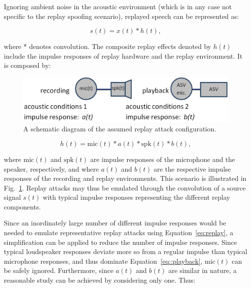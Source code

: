 Ignoring ambient noise in the acoustic environment (which is in any case not specific to the replay spoofing scenario), replayed speech can be represented as:


\begin{equation}
s(t) = x(t)*h(t),
\label{eq:replay}
\end{equation}


\noindent where * denotes convolution.  The composite replay effects denoted by $h(t)$ include the impulse responses of replay hardware and the replay environment.  It is composed by:


\begin{figure}
	\includegraphics[width=1\linewidth]{Figs/replay.png}
	\caption{A schematic diagram of the assumed replay attack configuration. %
}
	\label{fig::Replay}
\end{figure}

\begin{equation}
h(t) = \mathrm{mic}(t) * a(t) * \mathrm{spk}(t) * b(t),
\label{eq::playback}
\end{equation}


\noindent where $\mathrm{mic}(t)$ and $\mathrm{spk}(t)$ are impulse responses of the microphone and the speaker, respectively, and where $a(t)$ and $b(t)$ are the respective impulse responses of the recording and replay environments.  This scenario is illustrated in Fig.~\ref{fig::Replay}.  Replay attacks may thus be emulated through the convolution of a source signal $s(t)$ with typical impulse responses representing the different replay components.

Since an inordinately large number of different impulse responses would be needed to emulate representative replay attacks using Equation~\ref{eq:replay}, a simplification can be applied to reduce the number of impulse responses.  Since typical loudspeaker responses deviate more so from a regular impulse than typical microphone responses, and thus dominate Equation~\ref{eq::playback}, $\mathrm{mic}(t)$ can be safely ignored.  Furthermore, since $a(t)$ and $b(t)$ are similar in nature, a reasonable study can be achieved by considering only one.  Thus:

